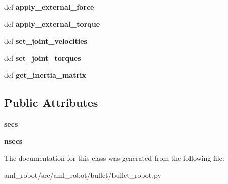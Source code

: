 \begin{DoxyCompactItemize}
\item 
\hypertarget{classaml__robot_1_1bullet_1_1bullet__robot_1_1_bullet_robot_a16cd3128a33a669b715262a6566e7412}{def {\bfseries apply\-\_\-external\-\_\-force}}\label{classaml__robot_1_1bullet_1_1bullet__robot_1_1_bullet_robot_a16cd3128a33a669b715262a6566e7412}

\item 
\hypertarget{classaml__robot_1_1bullet_1_1bullet__robot_1_1_bullet_robot_acb39fd8e2a984ee5bf7b2d4f22d3cfcf}{def {\bfseries apply\-\_\-external\-\_\-torque}}\label{classaml__robot_1_1bullet_1_1bullet__robot_1_1_bullet_robot_acb39fd8e2a984ee5bf7b2d4f22d3cfcf}

\item 
\hypertarget{classaml__robot_1_1bullet_1_1bullet__robot_1_1_bullet_robot_a6887b7c121e80a302f9e77dc94c9c39a}{def {\bfseries set\-\_\-joint\-\_\-velocities}}\label{classaml__robot_1_1bullet_1_1bullet__robot_1_1_bullet_robot_a6887b7c121e80a302f9e77dc94c9c39a}

\item 
\hypertarget{classaml__robot_1_1bullet_1_1bullet__robot_1_1_bullet_robot_ae26eef83ee4b61ab862e9c5221cce502}{def {\bfseries set\-\_\-joint\-\_\-torques}}\label{classaml__robot_1_1bullet_1_1bullet__robot_1_1_bullet_robot_ae26eef83ee4b61ab862e9c5221cce502}

\item 
\hypertarget{classaml__robot_1_1bullet_1_1bullet__robot_1_1_bullet_robot_aa6ede6bc549404e2b75464bec59714c7}{def {\bfseries get\-\_\-inertia\-\_\-matrix}}\label{classaml__robot_1_1bullet_1_1bullet__robot_1_1_bullet_robot_aa6ede6bc549404e2b75464bec59714c7}

\end{DoxyCompactItemize}
\subsection*{Public Attributes}
\begin{DoxyCompactItemize}
\item 
\hypertarget{classaml__robot_1_1bullet_1_1bullet__robot_1_1_bullet_robot_a3cdc1bf005b6630f0203ed619efea025}{{\bfseries secs}}\label{classaml__robot_1_1bullet_1_1bullet__robot_1_1_bullet_robot_a3cdc1bf005b6630f0203ed619efea025}

\item 
\hypertarget{classaml__robot_1_1bullet_1_1bullet__robot_1_1_bullet_robot_abb74eba05243f830c2e80b35ff3f94aa}{{\bfseries nsecs}}\label{classaml__robot_1_1bullet_1_1bullet__robot_1_1_bullet_robot_abb74eba05243f830c2e80b35ff3f94aa}

\end{DoxyCompactItemize}


The documentation for this class was generated from the following file\-:\begin{DoxyCompactItemize}
\item 
aml\-\_\-robot/src/aml\-\_\-robot/bullet/bullet\-\_\-robot.\-py\end{DoxyCompactItemize}
